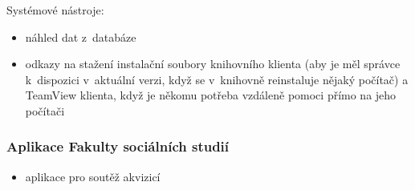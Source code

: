 \documentclass[
	11pt, oneside, printed, draft, 
	table,   %
	lof,     %
	lot     %
]{fithesis3}
\begin{document}
{Systémové nástroje:

\begin{itemize}
\item náhled dat z~databáze
\item odkazy na stažení instalační soubory knihovního klienta (aby je měl správce k~dispozici v~aktuální verzi, když se v~knihovně reinstaluje nějaký počítač) a TeamView klienta, když je někomu potřeba vzdáleně pomoci přímo na jeho počítači
\end{itemize}

\subsubsection{Aplikace Fakulty sociálních studií}

\begin{itemize}
\item aplikace pro soutěž akvizicí
\end{itemize}

}
\end{document}
